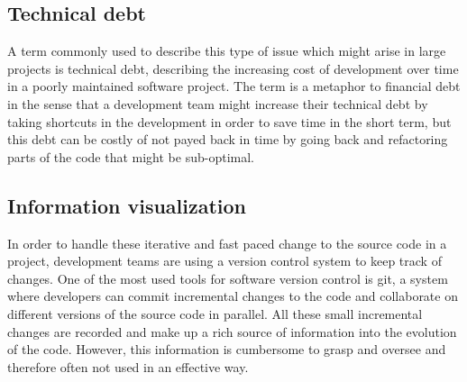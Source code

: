 \subsection{Technical debt}
A term commonly used to describe this type of issue which might arise in large projects is technical debt, describing the increasing cost of development over time in a poorly maintained software project. The term is a metaphor to financial debt in the sense that a development team might increase their technical debt by taking shortcuts in the development in order to save time in the short term, but this debt can be costly of not payed back in time by going back and refactoring parts of the code that might be sub-optimal.

\subsection{Information visualization}
In order to handle these iterative and fast paced change to the source code in a project, development teams are using a version control system to keep track of changes. One of the most used tools for software version control is git, a system where developers can commit incremental changes to the code and collaborate on different versions of the source code in parallel. All these small incremental changes are recorded and make up a rich source of information into the evolution of the code. However, this information is cumbersome to grasp and oversee and therefore often not used in an effective way.
